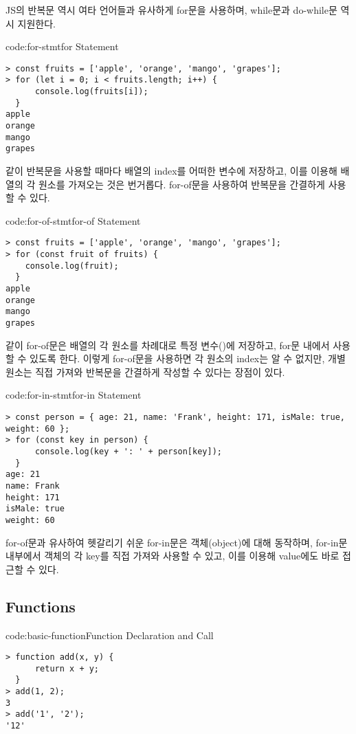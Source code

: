 JS의 반복문 역시 여타 언어들과 유사하게 for문을 사용하며, while문과 do-while문 역시 지원한다.

\begin{codeenv}{code:for-stmt}{for Statement}\begin{verbatim}
> const fruits = ['apple', 'orange', 'mango', 'grapes'];
> for (let i = 0; i < fruits.length; i++) {
      console.log(fruits[i]);
  }
apple
orange
mango
grapes
\end{verbatim}
\end{codeenv}

\와 같이 반복문을 사용할 때마다 배열의 index를 어떠한 변수에 저장하고, 이를 이용해 배열의 각 원소를 가져오는 것은 번거롭다. for-of문을 사용하여 반복문을 간결하게 사용할 수 있다.

\begin{codeenv}{code:for-of-stmt}{for-of Statement}\begin{verbatim}
> const fruits = ['apple', 'orange', 'mango', 'grapes'];
> for (const fruit of fruits) {
    console.log(fruit);
  }
apple
orange
mango
grapes
\end{verbatim}
\end{codeenv}
\clearpage

\와 같이 for-of문은 배열의 각 원소를 차례대로 특정 변수()에 저장하고, for문 내에서 사용할 수 있도록 한다. 이렇게 for-of문을 사용하면 각 원소의 index는 알 수 없지만, 개별 원소는 직접 가져와 반복문을 간결하게 작성할 수 있다는 장점이 있다.

\begin{codeenv}{code:for-in-stmt}{for-in Statement}\begin{verbatim}
> const person = { age: 21, name: 'Frank', height: 171, isMale: true, weight: 60 };
> for (const key in person) {
      console.log(key + ': ' + person[key]);
  }
age: 21
name: Frank
height: 171
isMale: true
weight: 60
\end{verbatim}
\end{codeenv}

for-of문과 유사하여 헷갈리기 쉬운 for-in문은 객체(object)에 대해 동작하며, for-in문 내부에서 객체의 각 key를 직접 가져와 사용할 수 있고, 이를 이용해 value에도 바로 접근할 수 있다.

\subsection*{Functions}

\begin{codeenv}{code:basic-function}{Function Declaration and Call}\begin{verbatim}
> function add(x, y) {
      return x + y;
  }
> add(1, 2);
3
> add('1', '2');
'12'
\end{verbatim}
\end{codeenv}


